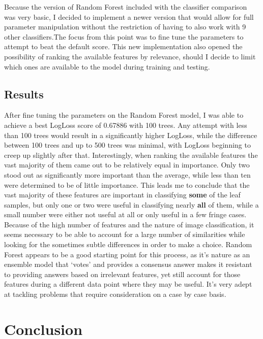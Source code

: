 \documentclass[12pt]{article}
\begin{document}
Because the version of Random Forest included with the classifier comparison was very basic, I decided to implement a newer version that would allow for full parameter manipulation without the restriction of having to also work with 9 other classifiers.The focus from this point was to fine tune the parameters to attempt to beat the default score. This new implementation also opened the possibility of ranking the available features by relevance, should I decide to limit which ones are available to the model during training and testing.

\subsection{Results}

After fine tuning the parameters on the Random Forest model, I was able to achieve a best LogLoss score of 0.67886 with 100 trees.  Any attempt with less than 100 trees would result in a significantly higher LogLoss, while the difference between 100 trees and up to 500 trees was minimal, with LogLoss beginning to creep up slightly after that. Interestingly, when ranking the available features the vast majority of them came out to be relatively equal in importance. Only two stood out as significantly more important than the average, while less than ten were determined to be of little importance. This leads me to conclude that the vast majority of these features are important in classifying \textbf{some} of the leaf samples, but only one or two were useful in classifying nearly \textbf{all} of them, while a small number were either not useful at all or only useful in a few fringe cases. Because of the high number of features and the nature of image classification, it seems necessary to be able to account for a large number of similarities while looking for the sometimes subtle differences in order to make a choice. Random Forest appears to be a good starting point for this process, as it's nature as an ensemble model that `votes' and provides a consensus answer makes it resistant to providing answers based on irrelevant features, yet still account for those features during a different data point where they may be useful. It's very adept at tackling problems that require consideration on a case by case basis.

\section{Conclusion}
\end{document}
